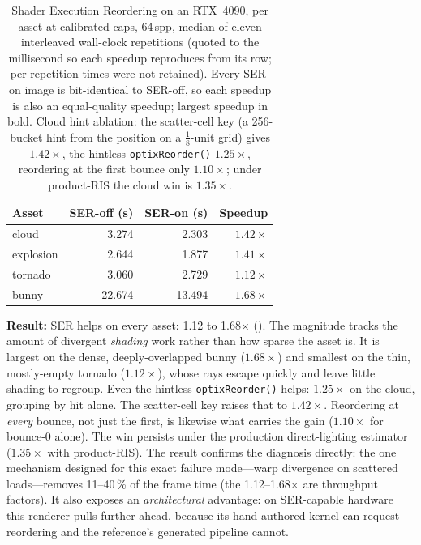 \begin{table}[htp]
  \centering
  \begin{tabular}{@{}lrrr@{}}
    \toprule
    Asset & SER-off (s) & SER-on (s) & Speedup \\
    \midrule
    cloud     & 3.274  & 2.303  & $1.42\times$ \\
    explosion & 2.644  & 1.877  & $1.41\times$ \\
    tornado   & 3.060  & 2.729  & $1.12\times$ \\
    bunny     & 22.674 & 13.494 & $\mathbf{1.68\times}$ \\
    \bottomrule
  \end{tabular}
  \caption{Shader Execution Reordering on an RTX~4090, per asset at calibrated caps, \num{64}\,spp,
median of eleven interleaved wall-clock repetitions (quoted to the millisecond so each
speedup reproduces from its row; per-repetition times were not retained). Every SER-on image is bit-identical to SER-off, so each speedup is also an equal-quality
speedup; largest speedup in bold. Cloud hint ablation: the scatter-cell key (a \num{256}-bucket hint from the position on a
$\tfrac{1}{8}$-unit grid) gives $1.42\times$, the hintless \texttt{optixReorder()}
$1.25\times$, reordering at the first bounce only $1.10\times$; under product-RIS the
cloud win is $1.35\times$.}
  \label{tab:ser}
\end{table}

\textbf{Result:} SER helps on every asset: \num{1.12} to \num{1.68}$\times$ (). The
magnitude tracks the amount of divergent \emph{shading} work rather than how sparse the asset is. It is largest on
the dense, deeply-overlapped bunny ($1.68\times$) and smallest on the thin, mostly-empty tornado
($1.12\times$), whose rays escape quickly and leave little shading to regroup. Even the hintless \texttt{optixReorder()} helps: $1.25\times$ on the cloud, grouping by
hit alone. The scatter-cell key raises that to $1.42\times$. Reordering at \emph{every} bounce, not just the first, is likewise what carries the gain
($1.10\times$ for bounce-0 alone). The win persists under the production direct-lighting estimator
($1.35\times$ with product-RIS). The result confirms the  diagnosis
directly: the one mechanism designed for this exact failure mode---warp divergence on
scattered loads---removes \num{11}--\num{40}\,\% of the frame time (the
\num{1.12}--\num{1.68}$\times$ are throughput factors). It also exposes an
\emph{architectural} advantage: on SER-capable hardware this renderer pulls further ahead,
because its hand-authored kernel can request reordering and the reference's generated
pipeline cannot.

